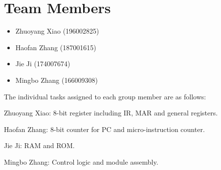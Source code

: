 \section{Team Members}
\label{sec:team}


\begin{itemize}
	\item Zhuoyang Xiao (196002825)
	\item Haofan Zhang (187001615)
	\item Jie Ji (174007674)
	\item Mingbo Zhang (166009308)
\end{itemize}


The individual tasks assigned to each group member are as follows:

Zhuoyang Xiao: 8-bit register including IR, MAR and general registers.

Haofan Zhang: 8-bit counter for PC and micro-instruction counter.

Jie Ji: RAM and ROM.

Mingbo Zhang: Control logic and module assembly.
